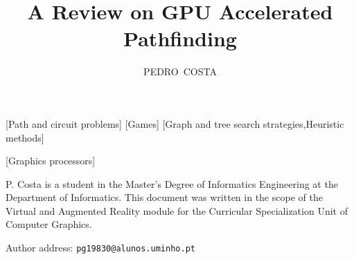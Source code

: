 \documentclass{acmtog}
\begin{document}

\title{A Review on GPU Accelerated Pathfinding} %

\author{PEDRO~COSTA%
}


[Path and circuit problems]
[Games]
[Graph and tree search strategies,Heuristic methods]

[Graphics processors]




\maketitle

\begin{bottomstuff} 
P. Costa is a student in the Master's Degree of Informatics Engineering at the Department of Informatics. This document was written in the scope of the Virtual and Augmented Reality module for the Curricular Specialization Unit of Computer Graphics.

Author address: \texttt{pg19830@alunos.uminho.pt}
\end{bottomstuff}












\end{document}
